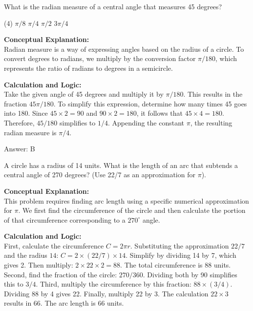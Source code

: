 \documentclass[11pt,paper=a4,answers]{exam}
\begin{document}
\begin{questions}
\vspace{60pt}

\question
What is the radian measure of a central angle that measures 45 degrees?
\begin{tasks}(4)
    \task $\pi/8$
    \task $\pi/4$
    \task $\pi/2$
    \task $3\pi/4$
\end{tasks}

\begin{solution}
\textbf{Conceptual Explanation:} \\
Radian measure is a way of expressing angles based on the radius of a circle. To convert degrees to radians, we multiply by the conversion factor $\pi / 180$, which represents the ratio of radians to degrees in a semicircle.

\vspace{30pt}

\textbf{Calculation and Logic:} \\
Take the given angle of 45 degrees and multiply it by $\pi / 180$. This results in the fraction $45\pi / 180$. To simplify this expression, determine how many times 45 goes into 180. Since $45 \times 2 = 90$ and $90 \times 2 = 180$, it follows that $45 \times 4 = 180$. Therefore, $45 / 180$ simplifies to $1 / 4$. Appending the constant $\pi$, the resulting radian measure is $\pi / 4$.

\vspace{30pt}

Answer: \colorbox{yellow!100}{B}
\end{solution}

\vspace{60pt}

\question
A circle has a radius of 14 units. What is the length of an arc that subtends a central angle of 270 degrees? (Use 22/7 as an approximation for $\pi$).

\begin{solution}
\textbf{Conceptual Explanation:} \\
This problem requires finding arc length using a specific numerical approximation for $\pi$. We first find the circumference of the circle and then calculate the portion of that circumference corresponding to a $270^\circ$ angle.

\vspace{30pt}

\textbf{Calculation and Logic:} \\
First, calculate the circumference $C = 2\pi r$. Substituting the approximation $22/7$ and the radius $14$: $C = 2 \times (22/7) \times 14$. Simplify by dividing 14 by 7, which gives 2. Then multiply: $2 \times 22 \times 2 = 88$. The total circumference is 88 units. Second, find the fraction of the circle: $270 / 360$. Dividing both by 90 simplifies this to $3 / 4$. Third, multiply the circumference by this fraction: $88 \times (3 / 4)$. Dividing 88 by 4 gives 22. Finally, multiply 22 by 3. The calculation $22 \times 3$ results in 66. The arc length is 66 units.


\end{solution}
\end{questions}
\end{document}
